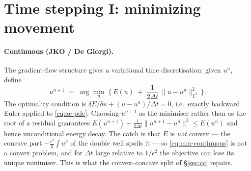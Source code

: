 \documentclass[11pt]{article}
\newcommand{\dt}{\Delta t}
\begin{document}
\section{Time stepping I: minimizing movement}

\paragraph{Continuous (JKO / De Giorgi).}
The gradient-flow structure gives a variational time discretisation: given $u^n$, define
\begin{equation}\label{eq:mm-continuous}
   u^{n+1} \;=\; \arg\min_{u}\;\Big\{\, E(u) \;+\; \frac{1}{2\dt}\,\|u-u^n\|_{L^2}^2 \,\Big\}.
\end{equation}
The optimality condition is $\delta E/\delta u + (u-u^n)/\dt = 0$, i.e.\ exactly backward Euler
applied to \eqref{eq:ac-pde}. Choosing $u^{n+1}$ as the minimiser rather than as the root of a
residual guarantees $E(u^{n+1}) + \tfrac{1}{2\dt}\|u^{n+1}-u^n\|^2 \le E(u^n)$ and hence
unconditional energy decay. The catch is that $E$ is \emph{not} convex --- the concave part
$-\tfrac{\epsilon^2}{2}\int u^2$ of the double well spoils it --- so \eqref{eq:mm-continuous} is
not a convex problem, and for $\dt$ large relative to $1/\epsilon^2$ the objective can lose its
unique minimiser. This is what the convex--concave split of \S\ref{sec:cc} repairs.
\end{document}
